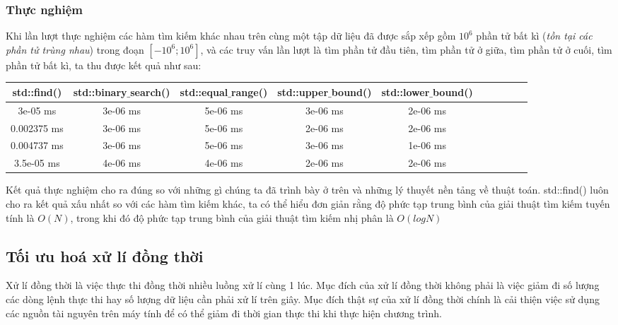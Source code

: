 \documentclass{article}
\begin{document}
\subsubsection{Thực nghiệm}
Khi lần lượt thực nghiệm các hàm tìm kiếm khác nhau trên cùng một tập dữ liệu đã được sắp xếp gồm $10^6$ phần tử bất kì (\textit{tồn tại các phần tử trùng nhau}) trong đoạn $\left[-10^6;10^6\right]$, và các truy vấn lần lượt là tìm phần tử đầu tiên, tìm phần tử ở giữa, tìm phần tử ở cuối, tìm phần tử bất kì, ta thu được kết quả như sau:
\begin{center}
        \begin{tabular}{|c|c| c|c| c|c| c|c| c|c|}
        \hline
            std::find() & std::binary$\_$search() & std::equal$\_$range() & std::upper$\_$bound() & std::lower$\_$bound()\\
            \hline
            3e-05 ms & 3e-06 ms & 5e-06 ms & 3e-06 ms & 2e-06 ms \\
            \hline
            0.002375 ms & 3e-06 ms & 5e-06 ms & 2e-06 ms & 2e-06 ms\\
            \hline
            0.004737 ms & 3e-06 ms &  5e-06 ms & 3e-06 ms & 1e-06 ms\\
            \hline
            3.5e-05 ms & 4e-06 ms & 4e-06 ms & 2e-06 ms & 2e-06 ms\\
        \hline 
        \end{tabular}
    \end{center}
Kết quả thực nghiệm cho ra đúng so với những gì chúng ta đã trình bày ở trên và những lý thuyết nền tảng về thuật toán. std::find() luôn cho ra kết quả xấu nhất so với các hàm tìm kiếm khác, ta có thể hiểu đơn giản rằng độ phức tạp trung bình của giải thuật tìm kiếm tuyến tính là $O(N)$, trong khi đó độ phức tạp trung bình của giải thuật tìm kiếm nhị phân là $O(logN)$
\subsection{Tối ưu hoá xử lí đồng thời}
Xử lí đồng thời là việc thực thi đồng thời nhiều luồng xử lí cùng 1 lúc. Mục đích của xử lí đồng thời không phải là việc giảm đi số lượng các dòng lệnh thực thi hay số lượng dữ liệu cần phải xử lí trên giây. Mục đích thật sự của xử lí đồng thời chính là cải thiện việc sử dụng các nguồn tài nguyên trên máy tính để có thể giảm đi thời gian thực thi khi thực hiện chương trình.
\end{document}
